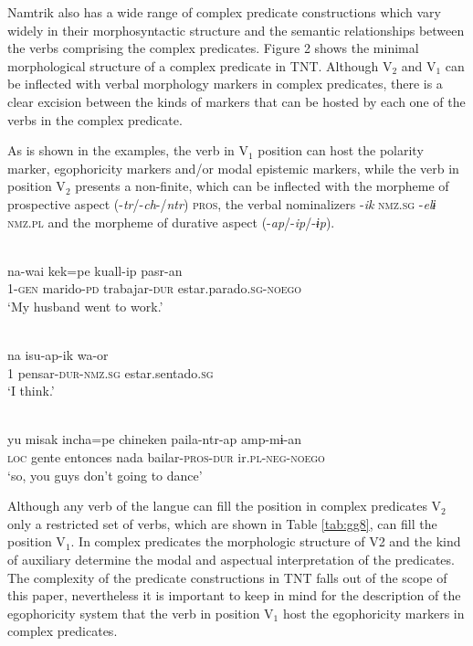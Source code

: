 \documentclass[output=paper]{langsci/langscibook}
\begin{document}
Namtrik also has a wide range of complex predicate constructions which vary widely in their morphosyntactic structure and the semantic relationships between the verbs comprising the complex predicates. Figure 2 %
shows the minimal morphological structure of a complex predicate in TNT. Although V$_2$ and V$_1$ can be inflected with verbal morphology markers in complex predicates, there is a clear excision between the kinds of markers that can be hosted by each one of the verbs in the complex predicate.  

As is shown in the examples, the verb in V$_1$ position can host the polarity marker, egophoricity markers and/or modal epistemic markers, while the verb in position V$_2$ presents a non-finite, which can be inflected with the morpheme of prospective aspect (-\textit{tr}/-\textit{ch}-/\textit{ntr}) \textsc{pros}, the verbal nominalizers -\textit{ik} \textsc{nmz.sg} -\textit{elɨ} \textsc{nmz.pl} and the morpheme of durative aspect (-\textit{ap}/-\textit{ip}/-\textit{ɨp}).


\ea \label{ex:gg33}
\\
    \gll na-wai	kek=pe	kuall-ip pasr-an\\
         1-\textsc{gen}	marido-\textsc{pd}	trabajar-\textsc{dur}	estar.parado.\textsc{sg-noego}\\
    \glt ‘My husband went to work.'
\z

\ea \label{ex:gg34}
\\
    \gll na	isu-ap-ik wa-or\\
         1	pensar-\textsc{dur-nmz.sg}	estar.sentado.\textsc{sg}\\
    \glt ‘I think.'
\z

\ea \label{ex:gg35}
\\
    \gll yu	misak	incha=pe	chineken	paila-ntr-ap	amp-mɨ-an\\
         \textsc{loc} gente	entonces nada bailar-\textsc{pros-dur} ir.\textsc{pl-neg-noego}\\
    \glt ‘so, you guys don’t going to dance'
\z

Although any verb of the langue can fill the position in complex predicates V$_2$ only a restricted set of verbs, which are shown in Table \ref{tab:gg8}, can fill the position V$_1$. In complex predicates the morphologic structure of V2 and the kind of auxiliary determine the modal and aspectual interpretation of the predicates. The complexity of the predicate constructions in TNT falls out of the scope of this paper, nevertheless it is important to keep in mind for the description of the egophoricity system that the verb in position V$_1$ host the egophoricity markers in complex predicates.
\end{document}
